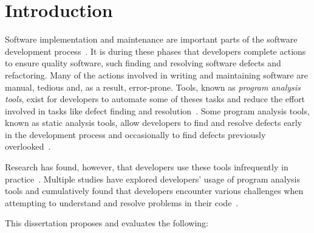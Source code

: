\chapter{Introduction}
\label{chap-one}

Software implementation and maintenance are important parts of the software development process~\cite{krishnan2000empirical}. It is during these phases that developers complete actions to ensure quality software, such finding and resolving software defects and refactoring.
Many of the actions involved in writing and maintaining software are manual, tedious and, as a result, error-prone.
Tools, known as \textit{program analysis tools}, exist for developers to automate some of theses tasks and reduce the effort involved in tasks like defect finding and resolution~\cite{bruckhaus1996impact}. 
Some program analysis tools, known as static analysis tools, allow developers to find and resolve defects early in the development process and occasionally to find defects previously overlooked~\cite{ayewah2010google,Ayewah:2008:FindBugs}.

Research has found, however, that developers use these tools infrequently in practice~\cite{Ayewah:2008:FindBugs, ge2012reconciling, smith2015questions}. 
Multiple studies have explored developers' usage of program analysis tools and cumulatively found that developers encounter various challenges when attempting to understand and resolve problems in their code~\cite{johnson2013don,smith2015questions,christakis2016developers}. 

This dissertation proposes and evaluates the following:

\vspace{0.5em}

\noindent{}

